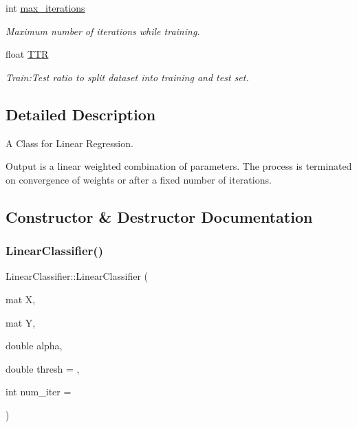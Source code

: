 \begin{DoxyCompactItemize}
\mbox{\label{classLinearClassifier_a033a4e3303991899df2de2e5578f4bfc}} 
int \hyperlink{classLinearClassifier_a033a4e3303991899df2de2e5578f4bfc}{max\+\_\+iterations}
\begin{DoxyCompactList}\small\item\em Maximum number of iterations while training. \end{DoxyCompactList}\item 
\mbox{\label{classLinearClassifier_a8466d8d873a34ffa84f8eb22b07c3394}} 
float \hyperlink{classLinearClassifier_a8466d8d873a34ffa84f8eb22b07c3394}{T\+TR}
\begin{DoxyCompactList}\small\item\em Train\+:Test ratio to split dataset into training and test set. \end{DoxyCompactList}\end{DoxyCompactItemize}


\subsection{Detailed Description}
A Class for Linear Regression. 

Output is a linear weighted combination of parameters. The process is terminated on convergence of weights or after a fixed number of iterations. 

\subsection{Constructor \& Destructor Documentation}
\mbox{\label{classLinearClassifier_a840feb0a19e17e7210796e5e8cd68d2b}} 
\subsubsection{\texorpdfstring{Linear\+Classifier()}{LinearClassifier()}}
{\footnotesize\ttfamily Linear\+Classifier\+::\+Linear\+Classifier (\begin{DoxyParamCaption}\item[{mat}]{X,  }\item[{mat}]{Y,  }\item[{double}]{alpha,  }\item[{double}]{thresh = {},  }\item[{int}]{num\+\_\+iter = {} }\end{DoxyParamCaption})}




